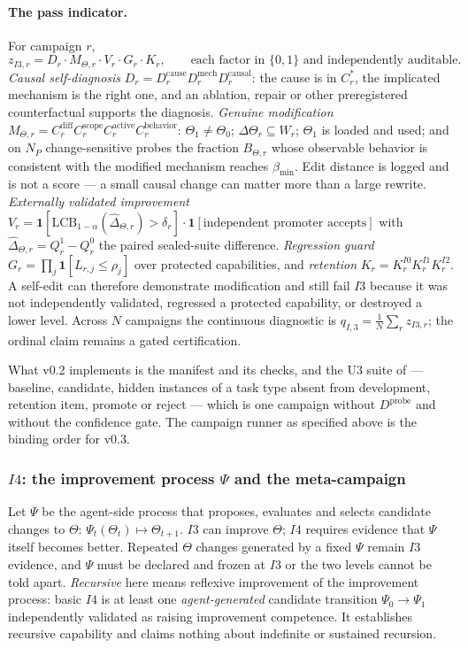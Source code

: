 \documentclass[11pt]{article}
\theoremstyle{definition}
\begin{document}
\paragraph{The pass indicator.} For campaign $r$,
\[
z_{I3,r} = D_r \cdot M_{\Theta,r} \cdot V_r \cdot G_r \cdot K_r, \qquad \text{each factor in } \{0,1\} \text{ and independently auditable.}
\]
\emph{Causal self-diagnosis} $D_r = D^{\mathrm{cause}}_r D^{\mathrm{mech}}_r D^{\mathrm{causal}}_r$: the cause is in $C^{*}_r$, the implicated mechanism is the right one, and an ablation, repair or other preregistered counterfactual supports the diagnosis. \emph{Genuine modification} $M_{\Theta,r} = C^{\mathrm{diff}}_r C^{\mathrm{scope}}_r C^{\mathrm{active}}_r C^{\mathrm{behavior}}_r$: $\Theta_1 \ne \Theta_0$; $\Delta\Theta_r \subseteq W_r$; $\Theta_1$ is loaded and used; and on $N_P$ change-sensitive probes the fraction $B_{\Theta,r}$ whose observable behavior is consistent with the modified mechanism reaches $\beta_{\min}$. Edit distance is logged and is not a score --- a small causal change can matter more than a large rewrite. \emph{Externally validated improvement} $V_r = \mathbf 1[\mathrm{LCB}_{1-\alpha}(\hat\Delta_{\Theta,r}) > \delta_r] \cdot \mathbf 1[\text{independent promoter accepts}]$ with $\hat\Delta_{\Theta,r} = Q^{1}_r - Q^{0}_r$ the paired sealed-suite difference. \emph{Regression guard} $G_r = \prod_j \mathbf 1[L_{r,j} \le \rho_j]$ over protected capabilities, and \emph{retention} $K_r = K^{I0}_r K^{I1}_r K^{I2}_r$. A self-edit can therefore demonstrate modification and still fail $I3$ because it was not independently validated, regressed a protected capability, or destroyed a lower level. Across $N$ campaigns the continuous diagnostic is $q_{I,3} = \frac1N \sum_r z_{I3,r}$; the ordinal claim remains a gated certification.

What v0.2 implements is the manifest and its checks, and the U3 suite of \citet{yang2026uab} --- baseline, candidate, hidden instances of a task type absent from development, retention item, promote or reject --- which is one campaign without $D^{\mathrm{probe}}$ and without the confidence gate. The campaign runner as specified above is the binding order for v0.3.

\subsubsection{$I4$: the improvement process $\Psi$ and the meta-campaign}\label{sec:i4}

Let $\Psi$ be the agent-side process that proposes, evaluates and selects candidate changes to $\Theta$: $\Psi_t(\Theta_t) \mapsto \Theta_{t+1}$. $I3$ can improve $\Theta$; $I4$ requires evidence that $\Psi$ itself becomes better. Repeated $\Theta$ changes generated by a fixed $\Psi$ remain $I3$ evidence, and $\Psi$ must be declared and frozen at $I3$ or the two levels cannot be told apart. \emph{Recursive} here means reflexive improvement of the improvement process: basic $I4$ is at least one \emph{agent-generated} candidate transition $\Psi_0 \to \Psi_1$ independently validated as raising improvement competence. It establishes recursive capability and claims nothing about indefinite or sustained recursion.
\end{document}

